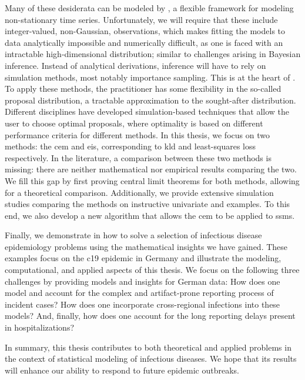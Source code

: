 Many of these desiderata can be modeled by , a flexible framework for modeling non-stationary time series. Unfortunately, we will require that these  include integer-valued, non-Gaussian, observations, which makes fitting the models to data analytically impossible and numerically difficult, as one is faced with an intractable high-dimensional distribution; similar to challenges arising in Bayesian inference. Instead of analytical derivations, inference will have to rely on simulation methods, most notably importance sampling. This is at the heart of . To apply these methods, the practitioner has some flexibility in the so-called proposal distribution, a tractable approximation to the sought-after distribution. Different disciplines have developed simulation-based techniques that allow the user to choose optimal proposals, where optimality is based on different performance criteria for different methods. In this thesis, we focus on two methods: the \gls{cem} and \gls{eis}, corresponding to \acrlong{kld} and least-squares loss respectively. In the literature, a comparison between these two methods is missing: there are neither mathematical nor empirical results comparing the two. We fill this gap by first proving central limit theorems for both methods, allowing for a theoretical comparison. Additionally, we provide extensive simulation studies comparing the methods on instructive univariate and  examples. To this end, we also develop a new algorithm that allows the \acrshort{cem} to be applied to \glspl{ssm}. 

Finally, we demonstrate in  how to solve a selection of infectious disease epidemiology problems using the mathematical insights we have gained. These examples focus on the \acrshort{c19} epidemic in Germany and illustrate the modeling, computational, and applied aspects of this thesis. We focus on the following three challenges by providing models and insights for German data: How does one model and account for the complex and artifact-prone reporting process of incident cases? How does one incorporate cross-regional infections into these models? And, finally, how does one account for the long reporting delays present in hospitalizations?

In summary, this thesis contributes to both theoretical and applied problems in the context of statistical modeling of infectious diseases. 
We hope that its results will enhance our ability to respond to future epidemic outbreaks.